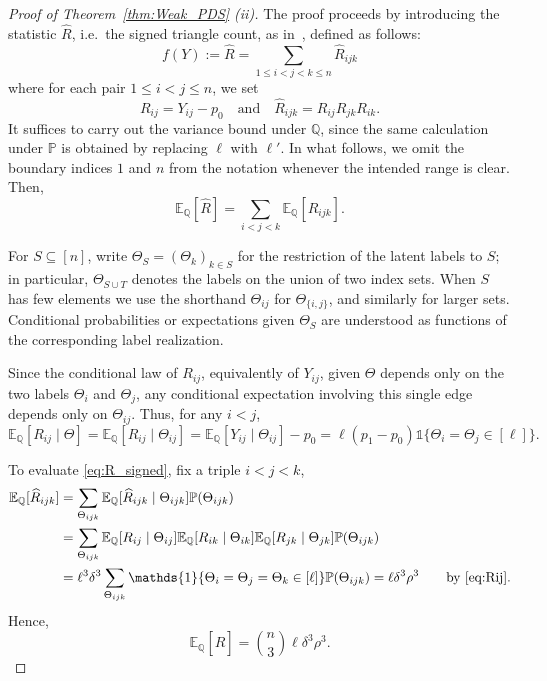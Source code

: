\documentclass[11pt, letterpaper]{article}
\numberwithin{equation}{section}
\newcommand{\PP}{\mathbb{P}}
\newcommand{\QQ}{\mathbb{Q}}
\begin{document}
\begin{proof}[Proof of Theorem~\ref{thm:Weak_PDS} \textnormal{(ii)}] The proof proceeds by introducing the statistic $\widehat{R}$, i.e.\ the signed triangle count, as in~\cite{bubeck2016testing,rush2023easier}, defined as follows: 
\[f(Y):= \widehat{R}
    = \sum_{1 \le i < j < k \le n} \widehat{R}_{ijk}\]
where for each pair \(1 \le i < j \le n\), we set
\[
R_{ij} = Y_{ij} - p_0 \quad \text{and} \quad \widehat{R}_{ijk} = R_{ij} R_{jk} R_{ik}.
\]
\noindent It suffices to carry out the variance bound under $\QQ$, since the same
calculation under $\PP$ is obtained by replacing $\ell$ with $\ell'$. In what follows, we omit the boundary indices \(1\) and \(n\) from the notation whenever the intended range is clear. Then, 
\begin{equation}\label{eq:R_signed}
\mathbb{E}_{\mathbb Q}[\widehat{R}] =  \sum_{i < j < k} \mathbb{E}_{\mathbb Q}[ \widehat{R}_{ijk}].
\end{equation}

\noindent For $S\subseteq[n]$, write $\Theta_S=(\Theta_k)_{k\in S}$ for the restriction of the latent labels to $S$; in particular, $\Theta_{S\cup T}$ denotes the labels on the union of two index sets. When $S$ has few elements we use the shorthand $\Theta_{ij}$ for $\Theta_{\{i,j\}}$, and similarly for larger sets. Conditional probabilities or expectations given $\Theta_S$ are understood as functions of the corresponding label realization.

Since the conditional law of $R_{ij}$, equivalently of $Y_{ij}$, given $\Theta$ depends only on the two labels $\Theta_i$ and $\Theta_j$, any conditional expectation involving this single edge depends only on $\Theta_{ij}$. Thus, for any $i<j$,
\begin{equation}\label{eq:Rij}
 \mathbb{E}_{\mathbb Q}[R_{ij} \mid \Theta] = \mathbb{E}_{\mathbb Q}[R_{ij} \mid \Theta_{ij}]= \mathbb{E}_{\mathbb Q}[Y_{ij} \mid \Theta_{ij}] -p_0=\ell (p_1-p_0) \mathds{1}\{\Theta_i = \Theta_j\in [\ell]\}. 
\end{equation}

\noindent To evaluate \eqref{eq:R_signed}, fix a triple $i < j < k$,
\begin{align*}
   \mathbb{E}_{\mathbb Q}[\widehat{R}_{ijk}] &= \sum_{\Theta_{ijk}}\mathbb{E}_{\mathbb Q}[\widehat{R}_{ijk} \mid \Theta_{ijk}]\mathbb P(\Theta_{ijk})\\
   &=\sum_{\Theta_{ijk}}\mathbb{E}_{\mathbb Q}[R_{ij} \mid \Theta_{ij} ]\mathbb{E}_{\mathbb Q}[R_{ik} \mid \Theta_{ik}]\mathbb{E}_{\mathbb Q}[R_{jk} \mid \Theta_{jk}]\mathbb P(\Theta_{ijk})\\
    &=\ell^3\delta^3 \sum_{\Theta_{ijk}} \mathds{1}\{\Theta_i = \Theta_j = \Theta_k \in [\ell]\}\mathbb P(\Theta_{ijk}) = \ell\delta^3\rho^3 \qquad \text{by \eqref{eq:Rij}}.
\end{align*}
Hence,
\begin{equation}\label{eq:EQ-EP}
\mathbb{E}_{\mathbb Q}[\widehat{R}] = \binom{n}{3}\ell\delta^3\rho^3.
\end{equation}


\end{proof}
\end{document}
